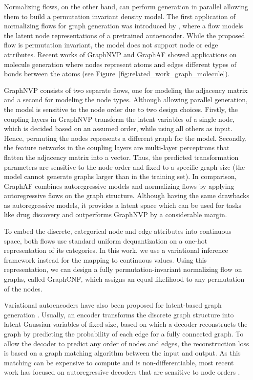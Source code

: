 Normalizing flows, on the other hand, can perform generation in parallel allowing them to build a permutation invariant density model.
The first application of normalizing flows for graph generation was introduced by \citet{GraphNF}, where a flow models the latent node representations of a pretrained autoencoder. 
While the proposed flow is permutation invariant, the model does not support node or edge attributes.
Recent works of GraphNVP \cite{GraphNVP} and GraphAF \cite{GraphAF} showed applications on molecule generation where nodes represent atoms and edges different types of bonds between the atoms (see Figure~\ref{fig:related_work_graph_molecule}). 

GraphNVP consists of two separate flows, one for modeling the adjacency matrix and a second for modeling the node types. 
Although allowing parallel generation, the model is sensitive to the node order due to two design choices.
Firstly, the coupling layers in GraphNVP transform the latent variables of a single node, which is decided based on an assumed order, while using all others as input.
Hence, permuting the nodes represents a different graph for the model. 
Secondly, the feature networks in the coupling layers are multi-layer perceptrons that flatten the adjacency matrix into a vector.
Thus, the predicted transformation parameters are sensitive to the node order and fixed to a specific graph size (the model cannot generate graphs larger than in the training set).
In comparison, GraphAF combines autoregressive models and normalizing flows by applying autoregressive flows on the graph structure. 
Although having the same drawbacks as autoregressive models, it provides a latent space which can be used for tasks like drug discovery \cite{MolecularRNN, GraphAF} and outperforms GraphNVP by a considerable margin.

To embed the discrete, categorical node and edge attributes into continuous space, both flows use standard uniform dequantization on a one-hot representation of its categories.
In this work, we use a variational inference framework instead for the mapping to continuous values. 
Using this representation, we can design a fully permutation-invariant normalizing flow on graphs, called GraphCNF, which assigns an equal likelihood to any permutation of the nodes.


Variational autoencoders have also been proposed for latent-based graph generation \cite{GraphVAE, GraphVAEConstrained, GraphVAEConstrained2, JunctionTreeVAE}. 
Usually, an encoder transforms the discrete graph structure into latent Gaussian variables of fixed size, based on which a decoder reconstructs the graph by predicting the probability of each edge for a fully connected graph. 
To allow the decoder to predict any order of nodes and edges, the reconstruction loss is based on a graph matching algorithm between the input and output.
As this matching can be expensive to compute and is non-differentiable, most recent work has focused on autoregressive decoders that are sensitive to node orders \cite{JunctionTreeVAE, GraphVAEConstrained2}.


